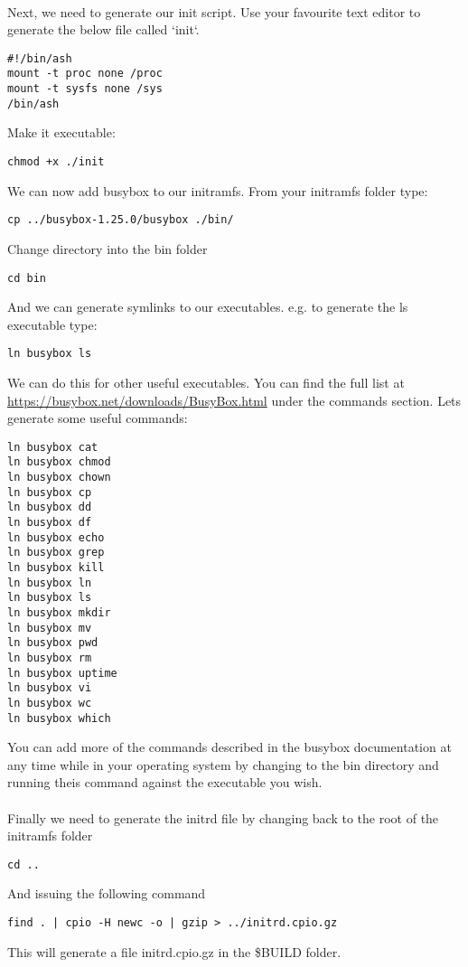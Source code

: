 \documentclass[twocolumn]{article}
\begin{document}
\\
Next, we need to generate our init script. Use your favourite text editor to generate the below file called `init`.
\begin{lstlisting}
#!/bin/ash
mount -t proc none /proc
mount -t sysfs none /sys
/bin/ash
\end{lstlisting}
Make it executable:
\begin{lstlisting}
chmod +x ./init
\end{lstlisting}
We can now add busybox to our initramfs. From your initramfs folder type:
\begin{lstlisting}
cp ../busybox-1.25.0/busybox ./bin/
\end{lstlisting}
Change directory into the bin folder
\begin{lstlisting}
cd bin
\end{lstlisting}
And we can generate symlinks to our executables. e.g. to generate the ls executable type:
\begin{lstlisting}
ln busybox ls
\end{lstlisting}
We can do this for other useful executables. You can find the full list at \url{https://busybox.net/downloads/BusyBox.html} under the commands section. Lets generate some useful commands:
\begin{lstlisting}
ln busybox cat
ln busybox chmod
ln busybox chown
ln busybox cp
ln busybox dd
ln busybox df
ln busybox echo
ln busybox grep
ln busybox kill
ln busybox ln
ln busybox ls
ln busybox mkdir
ln busybox mv
ln busybox pwd
ln busybox rm
ln busybox uptime
ln busybox vi
ln busybox wc
ln busybox which
\end{lstlisting}
You can add more of the commands described in the busybox documentation at any time while in your operating system by changing to the bin directory and running theis command against the executable you wish.\\
\\
Finally we need to generate the initrd file by changing back to the root of the initramfs folder
\begin{lstlisting}
cd ..
\end{lstlisting}
And issuing the following command
\begin{lstlisting}
find . | cpio -H newc -o | gzip > ../initrd.cpio.gz
\end{lstlisting}
This will generate a file initrd.cpio.gz in the \$BUILD folder. 
\end{document}
